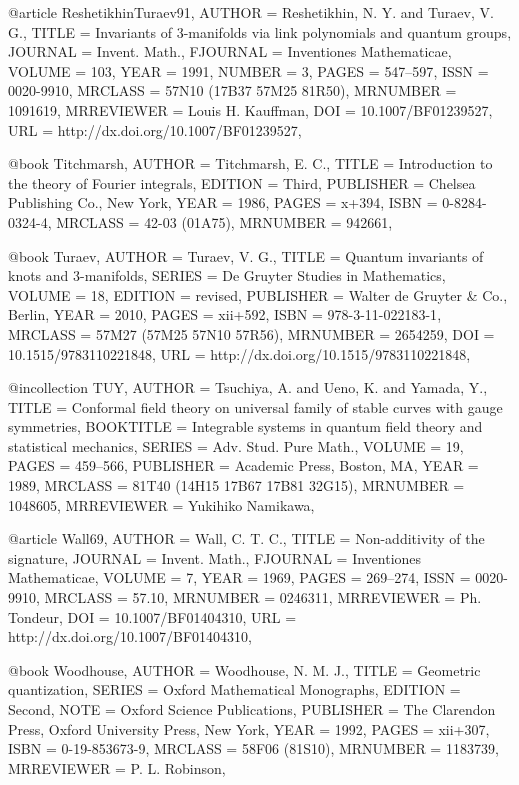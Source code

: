 @article {ReshetikhinTuraev91,
    AUTHOR = {Reshetikhin, N. Y. and Turaev, V. G.},
     TITLE = {Invariants of {$3$}-manifolds via link polynomials and quantum
              groups},
   JOURNAL = {Invent. Math.},
  FJOURNAL = {Inventiones Mathematicae},
    VOLUME = {103},
      YEAR = {1991},
    NUMBER = {3},
     PAGES = {547--597},
      ISSN = {0020-9910},
   MRCLASS = {57N10 (17B37 57M25 81R50)},
  MRNUMBER = {1091619},
MRREVIEWER = {Louis H. Kauffman},
       DOI = {10.1007/BF01239527},
       URL = {http://dx.doi.org/10.1007/BF01239527},
}

@book {Titchmarsh,
    AUTHOR = {Titchmarsh, E. C.},
     TITLE = {Introduction to the theory of {F}ourier integrals},
   EDITION = {Third},
 PUBLISHER = {Chelsea Publishing Co., New York},
      YEAR = {1986},
     PAGES = {x+394},
      ISBN = {0-8284-0324-4},
   MRCLASS = {42-03 (01A75)},
  MRNUMBER = {942661},
}


@book {Turaev,
    AUTHOR = {Turaev, V. G.},
     TITLE = {Quantum invariants of knots and 3-manifolds},
    SERIES = {De Gruyter Studies in Mathematics},
    VOLUME = {18},
   EDITION = {revised},
 PUBLISHER = {Walter de Gruyter \& Co., Berlin},
      YEAR = {2010},
     PAGES = {xii+592},
      ISBN = {978-3-11-022183-1},
   MRCLASS = {57M27 (57M25 57N10 57R56)},
  MRNUMBER = {2654259},
       DOI = {10.1515/9783110221848},
       URL = {http://dx.doi.org/10.1515/9783110221848},
}


@incollection {TUY,
    AUTHOR = {Tsuchiya, A. and Ueno, K. and Yamada, Y.},
     TITLE = {Conformal field theory on universal family of stable curves
              with gauge symmetries},
 BOOKTITLE = {Integrable systems in quantum field theory and statistical
              mechanics},
    SERIES = {Adv. Stud. Pure Math.},
    VOLUME = {19},
     PAGES = {459--566},
 PUBLISHER = {Academic Press, Boston, MA},
      YEAR = {1989},
   MRCLASS = {81T40 (14H15 17B67 17B81 32G15)},
  MRNUMBER = {1048605},
MRREVIEWER = {Yukihiko Namikawa},
}

@article {Wall69,
    AUTHOR = {Wall, C. T. C.},
     TITLE = {Non-additivity of the signature},
   JOURNAL = {Invent. Math.},
  FJOURNAL = {Inventiones Mathematicae},
    VOLUME = {7},
      YEAR = {1969},
     PAGES = {269--274},
      ISSN = {0020-9910},
   MRCLASS = {57.10},
  MRNUMBER = {0246311},
MRREVIEWER = {Ph. Tondeur},
       DOI = {10.1007/BF01404310},
       URL = {http://dx.doi.org/10.1007/BF01404310},
}

@book {Woodhouse,
    AUTHOR = {Woodhouse, N. M. J.},
     TITLE = {Geometric quantization},
    SERIES = {Oxford Mathematical Monographs},
   EDITION = {Second},
      NOTE = {Oxford Science Publications},
 PUBLISHER = {The Clarendon Press, Oxford University Press, New York},
      YEAR = {1992},
     PAGES = {xii+307},
      ISBN = {0-19-853673-9},
   MRCLASS = {58F06 (81S10)},
  MRNUMBER = {1183739},
MRREVIEWER = {P. L. Robinson},
}

